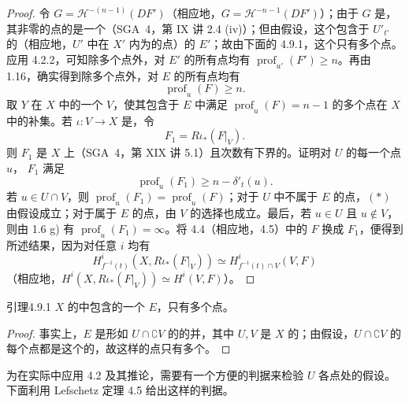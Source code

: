 \begin{proof}
令 $G=\mathcal H^{-(n-1)}(DF')$（相应地，$G=\mathcal H^{-n-1}(DF')$）；由于 $G$ 是，其非零的点的是一个（SGA~4，第 IX 讲 2.4 (iv)）；但由假设，这个包含于 $U'_{t'}$ 的（相应地，$U'$ 中在 $X'$ 内为的点）的 $E'$；故由下面的 4.9.1，这个只有多个点。应用 4.2.2，可知除多个点外，对 $E'$ 的所有点均有 $\operatorname{prof}_{u'}(F')\geq n$。再由 1.16，确实得到除多个点外，对 $E$ 的所有点均有
\[
\operatorname{prof}_u(F)\geq n.
\]
取 $Y$ 在 $X$ 中的一个 $V$，使其包含于 $E$ 中满足 $\operatorname{prof}_u(F)=n-1$ 的多个点在 $X$ 中的补集。若 $\iota:V\to X$ 是，令
\[
F_1=R\iota_*(F|_V).
\]
则 $F_1$ 是 $X$ 上（SGA~4，第 XIX 讲 5.1）且次数有下界的。证明对 $U$ 的每一个点 $u$， $F_1$ 满足
\[
\operatorname{prof}_u(F_1)\geq n-\delta'_t(u).\tag{*}
\]
若 $u\in U\cap V$，则 $\operatorname{prof}_u(F_1)=\operatorname{prof}_u(F)$；对于 $U$ 中不属于 $E$ 的点，$(*)$ 由假设成立；对于属于 $E$ 的点，由 $V$ 的选择也成立。最后，若 $u\in U$ 且 $u\notin V$，则由 1.6 g) 有 $\operatorname{prof}_u(F_1)=\infty$。将 4.4（相应地，4.5）中的 $F$ 换成 $F_1$，便得到所述结果，因为对任意 $i$ 均有
\[
H^i_{f^{-1}(t)}(X,R\iota_*(F|_V))\simeq H^i_{f^{-1}(t)\cap V}(V,F)
\]
（相应地，$H^i(X,R\iota_*(F|_V))\simeq H^i(V,F)$）。
\end{proof}

\begin{SGAresult}{引理}{4.9.1}
 $X$ 的中包含的一个 $E$，只有多个点。
\end{SGAresult}
\begin{proof}
事实上，$E$ 是形如 $U\cap\complement V$ 的的并，其中 $U,V$ 是 $X$ 的；由假设，$U\cap\complement V$ 的每个点都是这个的，故这样的点只有多个。
\end{proof}

为在实际中应用 4.2 及其推论，需要有一个方便的判据来检验 $U$ 各点处的假设。下面利用 Lefschetz 定理 4.5 给出这样的判据。

